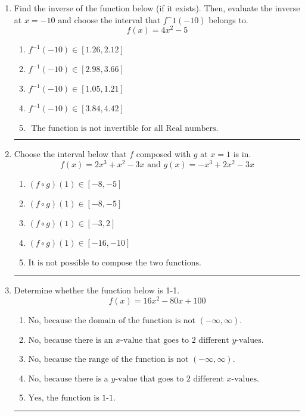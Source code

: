 \documentclass[14pt]{extbook}
\newcommand{\litem}[1]{\item#1\hspace*{-1cm}\rule{\textwidth}{0.4pt}}
\begin{document}
\begin{enumerate}
{\begin{enumerate}[label=\Alph*.]
\end{enumerate} }
\litem{
Find the inverse of the function below (if it exists). Then, evaluate the inverse at $x = -10$ and choose the interval that $f^-1(-10)$ belongs to.\[ f(x) = 4 x^2 - 5 \]\begin{enumerate}[label=\Alph*.]
\item \( f^{-1}(-10) \in [1.26, 2.12] \)
\item \( f^{-1}(-10) \in [2.98, 3.66] \)
\item \( f^{-1}(-10) \in [1.05, 1.21] \)
\item \( f^{-1}(-10) \in [3.84, 4.42] \)
\item \( \text{ The function is not invertible for all Real numbers. } \)

\end{enumerate} }
\litem{
Choose the interval below that $f$ composed with $g$ at $x=1$ is in.\[ f(x) = 2x^{3} + x^{2} -3 x \text{ and } g(x) = -x^{3} +2 x^{2} -3 x \]\begin{enumerate}[label=\Alph*.]
\item \( (f \circ g)(1) \in [-8, -5] \)
\item \( (f \circ g)(1) \in [-8, -5] \)
\item \( (f \circ g)(1) \in [-3, 2] \)
\item \( (f \circ g)(1) \in [-16, -10] \)
\item \( \text{It is not possible to compose the two functions.} \)

\end{enumerate} }
\litem{
Determine whether the function below is 1-1.\[ f(x) = 16 x^2 - 80 x + 100 \]\begin{enumerate}[label=\Alph*.]
\item \( \text{No, because the domain of the function is not $(-\infty, \infty)$.} \)
\item \( \text{No, because there is an $x$-value that goes to 2 different $y$-values.} \)
\item \( \text{No, because the range of the function is not $(-\infty, \infty)$.} \)
\item \( \text{No, because there is a $y$-value that goes to 2 different $x$-values.} \)
\item \( \text{Yes, the function is 1-1.} \)


\end{enumerate}}
\end{enumerate}
\end{document}
